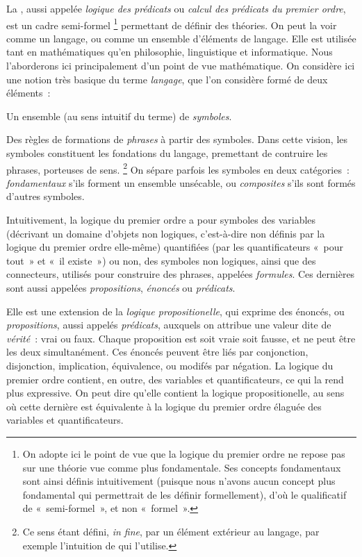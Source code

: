 \startsection[title=Logique du premier ordre]

La \emph{}, aussi appelée \emph{logique des prédicats} ou \emph{calcul des prédicats du premier ordre}, est un cadre semi-formel%
\footnote{On adopte ici le point de vue que la logique du premier ordre ne repose pas sur une théorie vue comme plus fondamentale. Ses concepts fondamentaux sont ainsi définis intuitivement (puisque nous n'avons aucun concept plus fondamental qui permettrait de les définir formellement), d'où le qualificatif de « semi-formel », et non « formel ».} 
permettant de définir des théories. 
On peut la voir comme un langage, ou comme un ensemble d'éléments de langage.
Elle est utilisée tant en mathématiques qu'en philosophie, linguistique et informatique. 
Nous l'aborderons ici principalement d'un point de vue mathématique.
On considère ici une notion très basique du terme \emph{langage}, que l'on considère formé de deux éléments : 
\startitemize[nowhite]
  \item Un ensemble (au sens intuitif du terme) de \emph{symboles}.
  \item Des règles de formations de \emph{phrases} à partir des symboles.
\stopitemize
Dans cette vision, les symboles constituent les fondations du langage, premettant de contruire les phrases, porteuses de sens.%
\footnote{ Ce sens étant défini, \emph{in fine}, par un élément extérieur au langage, par exemple l'intuition de qui l'utilise.} 
On sépare parfois les symboles en deux catégories : \emph{fondamentaux} s'ils forment un ensemble unsécable, ou \emph{composites} s'ils sont formés d'autres symboles.

Intuitivement, la logique du premier ordre a pour symboles des variables (décrivant un domaine d'objets non logiques, c'est-à-dire non définis par la logique du premier ordre elle-même) quantifiées (par les quantificateurs « pour tout » et « il existe ») ou non, des symboles non logiques, ainsi que des connecteurs, utilisés pour construire des phrases, appelées \emph{formules}. 
Ces dernières sont aussi appelées \emph{propositions}, \emph{énoncés} ou \emph{prédicats}.  

Elle est une extension de la \emph{logique propositionelle}, qui exprime des énoncés, ou \emph{propositions}, aussi appelés \emph{prédicats}, auxquels on attribue une valeur dite de \emph{vérité} : vrai ou faux.
Chaque proposition est soit vraie soit fausse, et ne peut être les deux simultanément. 
Ces énoncés peuvent être liés par conjonction, disjonction, implication, équivalence, ou modifés par négation. 
La logique du premier ordre contient, en outre, des variables et quantificateurs, ce qui la rend plus expressive. 
On peut dire qu'elle contient la logique propositionelle, au sens où cette dernière est équivalente à la logique du premier ordre élaguée des variables et quantificateurs.


